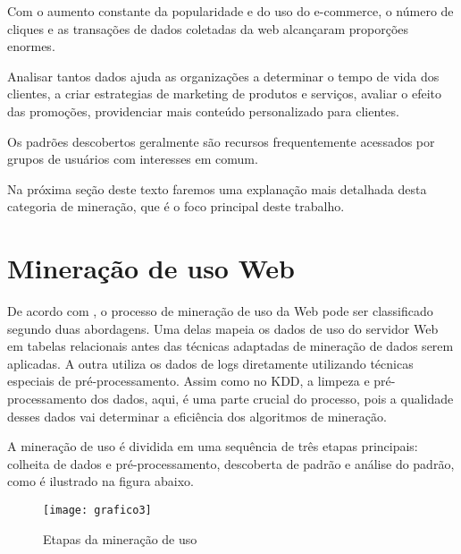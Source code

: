 	Com o aumento constante da popularidade e do uso do e-commerce, o número de cliques e as transações de dados coletadas da web alcançaram proporções enormes.

	Analisar tantos dados ajuda as organizações a determinar o tempo de vida dos clientes, a criar estrategias de marketing de produtos e serviços, avaliar o efeito das promoções, providenciar mais conteúdo personalizado para clientes.

	Os padrões descobertos geralmente são recursos frequentemente acessados por grupos de usuários com interesses em comum.

	Na próxima seção deste texto faremos uma explanação mais detalhada desta categoria de mineração, que é o foco principal deste trabalho.

\section{Mineração de uso Web}
    De acordo com \cite{Girardi}, o processo de mineração de uso da Web pode ser classificado segundo duas abordagens. Uma delas mapeia os dados de uso do servidor Web em tabelas relacionais antes das técnicas adaptadas de mineração de dados serem aplicadas. A outra utiliza os dados de logs diretamente utilizando técnicas especiais de pré-processamento. Assim como no KDD, a limpeza e pré-processamento dos dados, aqui, é uma parte crucial do processo, pois a qualidade desses dados vai determinar a eficiência dos algoritmos de mineração.

	A mineração de uso é dividida em uma sequência de três etapas principais: colheita de dados e pré-processamento, descoberta de padrão e análise do padrão, como é ilustrado na figura abaixo.

\begin{figure}[!htb]
\centering
\texttt{[image: grafico3]}
\caption{Etapas da mineração de uso}
\label{Rotulo}
\end{figure}

